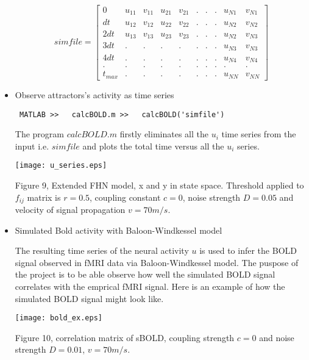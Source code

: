 \documentclass{article}
\begin{document}
\begin{itemize}
\[
simfile=
\left[ {\begin{array}{cccccccccc }
0  &  u_{11} & v_{11} & u_{21} & v_{21} & . &. & . & u_{N1} & v_{N1} \\
dt &  u_{12} & v_{12} & u_{22} & v_{22} & . &. & . & u_{N2} & v_{N2} \\
2dt &  u_{13} & v_{13} & u_{23} & v_{23} & . &. & . & u_{N2} & v_{N3} \\
3dt &  . & . & . & . & . &. & . & u_{N3} & v_{N3} \\
4dt &  . & . & . & . & . &. & . & u_{N4} & v_{N4} \\
. &  . & . & . & . & . &. & . & . & . \\
t_{max} &  . & . & . & . & . &. & . & u_{NN} & v_{NN}
\end{array} } \right]
\]

\item Observe attractors's activity as time series
 
\begin{lstlisting}
 MATLAB >>   calcBOLD.m >>   calcBOLD('simfile')
\end{lstlisting}

The program $calcBOLD.m$ firstly eliminates all the $u_i$ time series from the input i.e. $simfile$ and plots the total time versus all the $u_i$ series. 
\begin{center}
\texttt{[image: u\_series.eps]}
\end{center}

\begin{center}
\begin{footnotesize}
 Figure 9, Extended FHN model, x and y in state space. Threshold applied to $f_{ij}$ matrix is $r=0.5$, coupling constant $c=0$, noise strength $D=0.05$ and velocity of signal propagation $v=70 m/s$.
\end{footnotesize}
\end{center}

\item Simulated Bold activity with Baloon-Windkessel model

The resulting time series of the neural activity $u$ is used to infer the BOLD signal observed in fMRI data via Baloon-Windkessel model. The puspose of the project is to be able observe how well the simulated BOLD signal correlates with the emprical fMRI signal. Here is an example of how the simulated BOLD signal might look like. 

\begin{center}
\texttt{[image: bold\_ex.eps]}
\begin{footnotesize}
 Figure 10, correlation matrix of sBOLD, coupling strength $c=0$ and noise strength $D=0.01$, $v=70 m/s$. 
\end{footnotesize}
\end{center}

 
\end{itemize}
\end{document}
